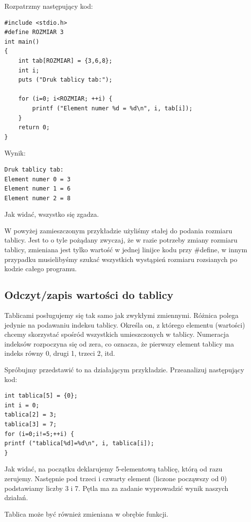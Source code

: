 \documentclass[a4paper,11pt]{article}
\begin{document}
\noindent
Rozpatrzmy następujący kod:
\begin{lstlisting}[caption=Deklaracja tablicy, captionpos=b,
label=src:passive2,frame=TB,numbers=none]
#include <stdio.h>
#define ROZMIAR 3
int main()
{
	int tab[ROZMIAR] = {3,6,8};
	int i;
	puts ("Druk tablicy tab:");

	for (i=0; i<ROZMIAR; ++i) {
		printf ("Element numer %d = %d\n", i, tab[i]);
	}
	return 0;
}
\end{lstlisting}
Wynik:
\begin{verbatim}
Druk tablicy tab:
Element numer 0 = 3
Element numer 1 = 6
Element numer 2 = 8
\end{verbatim}
Jak widać, wszystko się zgadza.

\noindent
W powyżej zamieszczonym przykładzie użyliśmy stałej do podania rozmiaru tablicy. Jest to o tyle pożądany zwyczaj, że w razie potrzeby zmiany rozmiaru tablicy, zmieniana jest tylko wartość w jednej linijce kodu przy \#define, w innym przypadku musielibyśmy szukać wszystkich wystąpień rozmiaru rozsianych po kodzie całego programu.

\subsection*{Odczyt/zapis wartości do tablicy} 
Tablicami posługujemy się tak samo jak zwykłymi zmiennymi. Różnica polega jedynie na podawaniu indeksu tablicy. Określa on, z którego elementu (wartości) chcemy skorzystać spośród wszystkich umieszczonych w tablicy. Numeracja indeksów rozpoczyna się od zera, co oznacza, że pierwszy element tablicy ma indeks równy 0, drugi 1, trzeci 2, itd.

\noindent
Spróbujmy przedstawić to na działającym przykładzie. Przeanalizuj następujący kod:
\begin{lstlisting}[caption=Odczyt wartości do tablicy, captionpos=b,
label=src:passive2,frame=TB,numbers=none]
int tablica[5] = {0};
int i = 0;
tablica[2] = 3;
tablica[3] = 7;
for (i=0;i!=5;++i) {
printf ("tablica[%d]=%d\n", i, tablica[i]);
}
\end{lstlisting}
Jak widać, na początku deklarujemy 5-elementową tablicę, którą od razu zerujemy. Następnie pod trzeci i czwarty element (liczone począwszy od 0) podstawiamy liczby 3 i 7. Pętla ma za zadanie wyprowadzić wynik naszych działań.

\noindent
Tablica może być również zmieniana w obrębie funkcji.
\end{document}
